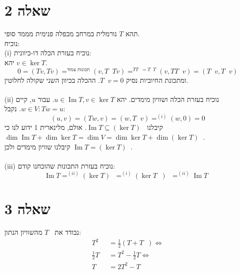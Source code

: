 \documentclass{article}
\DeclareMathOperator*{\equals}{=}
\DeclareMathOperator{\adj}{^\ast}
\DeclareMathOperator{\perc}{^\perp}
\DeclareMathOperator{\Image}{Im}
\begin{document}
\section*{שאלה 2}

תהא $T$ נורמלית במרחב מכפלה פנימית מממד סופי. \\
נוכיח: \\
(i) נוכיח בעזרת הכלה דו-כיוונית: \\
יהא $v\in \ker T$.
\[
    0=(Tv,Tv)\equals^{\text{תכונות צמוד}}(v, T\adj T v)\equals^{TT\adj = T \adj T}(v, TT\adj v)=(T \adj v, T \adj v)
\]
ומתכונת החיוביות נסיק $T \adj v=0$. ההכלה בכיוון השני שקולה לחלוטין. \\\\
(ii) נוכיח בעזרת הכלה ושוויון מימדים.
יהא $u\in \Image T, v\in \ker T$. עבור $u$, קיים $w\in V: Tw=u$. נקבל:
\[
    (u,v)=(Tw, v)=(w, T \adj v)\equals^{(i)}(w,0)=0
\]
קיבלנו $\Image T \subseteq (\ker T) \perc$.
אולם, מלינארית 1 ידוע לנו כי $\dim \Image T + \dim \ker T = \dim V = \dim \ker T + \dim (\ker T) \perc$. \\
קיבלנו שוויון מימדים ולכן $\Image T = (\ker T)\perc$.\\\\
(iii) נוכיח בעזרת התכונות שהוכחנו קודם:
\[
    \Image T \equals^{(ii)} (\ker T) \perc \equals^{(i)} (\ker T \adj) \perc \equals^{(ii)} \Image T \adj
\]

\section*{שאלה 3}

נבודד את $T \adj$ מהשוויון הנתון:
\begin{align*}
    T^2                & = \frac{1}{2} (T + T \adj) \Leftrightarrow \\
    \frac{1}{2} T \adj & = T^2 - \frac{1}{2} T \Leftrightarrow      \\
    T \adj             & = 2T^2 - T
\end{align*}
\end{document}
